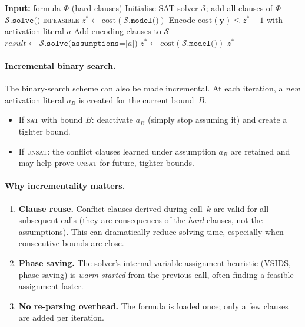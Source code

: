 \documentclass[11pt,a4paper]{article}
\begin{document}
\begin{algorithm}[ht]
\caption{Incremental SAT optimisation for Rack Configuration}
\label{alg:incr-sat}
\begin{algorithmic}[1]
\State \textbf{Input:} formula $\Phi$ (hard clauses)
\State Initialise SAT solver $\mathcal{S}$; add all clauses of $\Phi$
\State $\mathcal{S}.\texttt{solve()}$
  \State \Return \textsc{infeasible}
\EndIf
\State $z^{*} \leftarrow \mathrm{cost}(\mathcal{S}.\texttt{model()})$
\Loop
  \State Encode $\mathrm{cost}(\mathbf{y}) \le z^{*} - 1$
         with activation literal $a$
  \State Add encoding clauses to $\mathcal{S}$
  \State $\textit{result} \leftarrow
         \mathcal{S}.\texttt{solve(assumptions=[}a\texttt{])}$
    \State $z^{*} \leftarrow \mathrm{cost}(\mathcal{S}.\texttt{model()})$
  \Else
    \State \Return $z^{*}$
  \EndIf
\EndLoop
\end{algorithmic}
\end{algorithm}

\paragraph{Incremental binary search.}
The binary-search scheme can also be made incremental.
At each iteration, a \emph{new} activation literal $a_B$ is created
for the current bound~$B$.
\begin{itemize}
  \item If \textsc{sat} with bound $B$: deactivate $a_B$
        (simply stop assuming it) and create a tighter bound.
  \item If \textsc{unsat}: the conflict clauses learned
        under assumption $a_B$ are retained and may help prove
        \textsc{unsat} for future, tighter bounds.
\end{itemize}

\paragraph{Why incrementality matters.}
\begin{enumerate}
  \item \textbf{Clause reuse.}
        Conflict clauses derived during call~$k$ are valid
        for all subsequent calls (they are consequences of the
        \emph{hard} clauses, not the assumptions).
        This can dramatically reduce solving time, especially
        when consecutive bounds are close.

  \item \textbf{Phase saving.}
        The solver's internal variable-assignment heuristic
        (VSIDS, phase saving) is \emph{warm-started} from the
        previous call, often finding a feasible assignment faster.

  \item \textbf{No re-parsing overhead.}
        The formula is loaded once; only a few clauses are added
        per iteration.
\end{enumerate}
\end{document}
